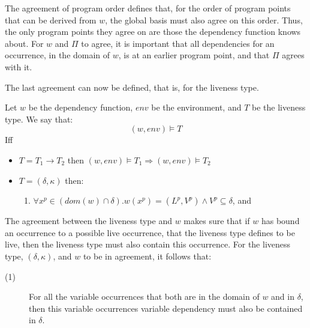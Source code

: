 \documentclass[../../master.tex]{subfiles}
\begin{document}
The agreement of program order defines that, for the order of program points that can be derived from $w$, the global basis must also agree on this order.
Thus, the only program points they agree on are those the dependency function knows about.
For $w$ and $\Pi$ to agree, it is important that all dependencies for an occurrence, in the domain of $w$, is at an earlier program point, and that $\Pi$ agrees with it.
\bigskip

The last agreement can now be defined, that is, for the liveness type.
\begin{definition}
	Let $w$ be the dependency function, $env$ be the environment, and $T$ be the liveness type.
	We say that:
	$$(w,env)\models T$$
	Iff
	\begin{itemize}
		\item $T=T_1\rightarrow T_2$ then $(w,env)\models T_1 \Rightarrow (w,env)\models T_2$
		\item $T=(\delta,\kappa)$ then:
		\begin{enumerate}
			\item $\forall x^p\in (dom(w)\cap\delta). w(x^p)=(L^p,V^p)\wedge V^p\subseteq\delta$, and
		\end{enumerate}
	\end{itemize}
\end{definition}

The agreement between the liveness type and $w$ makes sure that if $w$ has bound an occurrence to a possible live occurrence, that the liveness type defines to be live, then the liveness type must also contain this occurrence.
For the liveness type, $(\delta,\kappa)$, and $w$ to be in agreement, it follows that:
\begin{description}
	\item[(1)] For all the variable occurrences that both are in the domain of $w$ and in $\delta$, then this variable occurrences variable dependency must also be contained in $\delta$.
\end{description}
\end{document}
